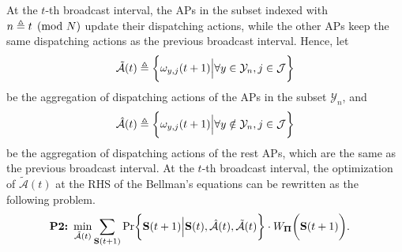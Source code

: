 At the $t$-th broadcast interval, the APs in the subset indexed with $n \triangleq t \pmod{N}$ update their dispatching actions, while the other APs keep the same dispatching actions as the previous broadcast interval.
Hence, let
\begin{align}
    \tilde{\mathcal{A}}(t) \triangleq \bigg\{ {\omega}_{y,j}(t+1) \Big| \forall y\in\mathcal{Y}_{n},j\in\mathcal{J} \bigg\}
\end{align}
be the aggregation of dispatching actions of the APs in the subset $\mathcal{Y}_{n}$, and
\begin{align}
    \hat{\mathcal{A}}(t) \triangleq \bigg\{ {\omega}_{y,j}(t+1) \Big| \forall y\notin\mathcal{Y}_{n}, j\in\mathcal{J}\bigg\}
\end{align}
be the aggregation of dispatching actions of the rest APs, which are the same as the previous broadcast interval.
At the $t$-th broadcast interval, the optimization of $\tilde{\mathcal{A}}(t)$ at the RHS of the Bellman's equations can be rewritten as the following problem.
{\small
\begin{align}
    \textbf{P2:}~
    \min_{ \tilde{\mathcal{A}}(t) }
    &\sum_{\Stat(t+1)} \Pr\Brace{
        \Stat(t+1) \Big| \Stat(t), \hat{\mathcal{A}}(t), \tilde{\mathcal{A}}(t)
    } \cdot W_{\Baseline}\Paren{\Stat(t+1)}.
\end{align}
}

